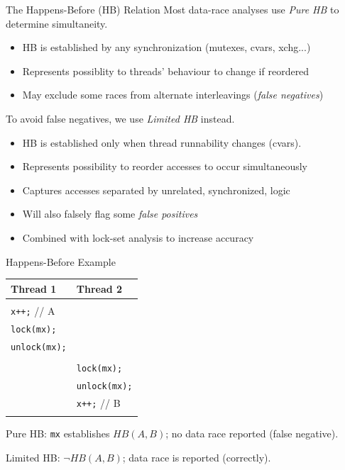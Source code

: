 \documentclass[xcolor=dvipsnames]{beamer}
\begin{document}
\begin{frame}{The Happens-Before (HB) Relation}
	Most data-race analyses use {\em Pure HB} to determine simultaneity.
	\begin{itemize}
		\item HB is established by any synchronization (mutexes, cvars, xchg...)
		\item Represents possiblity to threads' behaviour to change if reordered
		\item May exclude some races from alternate interleavings ({\em false negatives})
	\end{itemize}
	\pause
	\linegap

	To avoid false negatives, we use {\em Limited HB} instead.
	\begin{itemize}
		\item HB is established only when thread runnability changes (cvars).
		\item Represents possibility to reorder accesses to occur simultaneously
		\item Captures accesses separated by unrelated, synchronized, logic
		\item Will also falsely flag some {\em false positives}
		\item Combined with lock-set analysis to increase accuracy
	\end{itemize}
\end{frame}


\begin{frame}{Happens-Before Example}
	\begin{center}
		\begin{tabular}{|l|l|}
			\hline
			\cellcolor{thread1} {\bf Thread 1} & \cellcolor{thread2} {\bf Thread 2} \\
			\hline
			& \\
			\small \texttt{x++;} // A & \\
			\small \texttt{lock(mx);} & \\
			\small \texttt{unlock(mx);} & \\
			
			& \\
			& \small \texttt{lock(mx);} \\
			& \small \texttt{unlock(mx);} \\
			& \small \texttt{x++;} // B \\
			& \\
			\hline
		\end{tabular}
	\end{center}
	Pure HB: \texttt{mx} establishes $HB(A, B)$; no data race reported (false negative).
	\linegap

	Limited HB: $\neg HB(A, B)$; data race is reported (correctly).
\end{frame}
\end{document}
